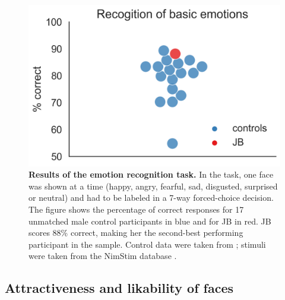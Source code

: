 \documentclass[fleqn,10pt]{SelfArx} %
\begin{document}
\begin{figure}[htbp]
	
	\renewcommand{\familydefault}{\sfdefault}\normalfont
	\centering
	\includegraphics[width=\columnwidth]{../reports/figures/emofaces_main_figure.png}
	\vspace*{-3mm}
 		\caption{\textbf{Results of the emotion recognition task.} In the task, one face was shown at a time (happy, angry, fearful, sad, disgusted, surprised or neutral) and had to be labeled in a 7-way forced-choice decision. The figure shows the percentage of correct responses for 17 unmatched male control participants in blue and for JB in red. JB scores 88\% correct, making her the second-best performing participant in the sample. Control data were taken from \citet{Wegrzyn_2017}; stimuli were taken from the NimStim database \citep{Tottenham_2009}.}%
	\label{fig:emo}
	
\end{figure}

 

\subsection*{Attractiveness and likability of faces}
\end{document}
